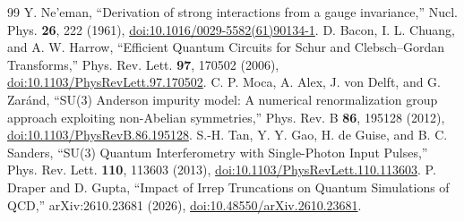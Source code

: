 \documentclass[aps,onecolumn,10pt,superscriptaddress,floatfix,nofootinbib]{revtex4}
\begin{document}
\begin{thebibliography}{99}
 Y. Ne'eman, ``Derivation of strong interactions from a gauge invariance,'' Nucl. Phys. \textbf{26}, 222 (1961), \href{https://doi.org/10.1016/0029-5582(61)90134-1}{doi:10.1016/0029-5582(61)90134-1}.
 D. Bacon, I. L. Chuang, and A. W. Harrow, ``Efficient Quantum Circuits for Schur and Clebsch--Gordan Transforms,'' Phys. Rev. Lett. \textbf{97}, 170502 (2006), \href{https://doi.org/10.1103/PhysRevLett.97.170502}{doi:10.1103/PhysRevLett.97.170502}.
 C. P. Moca, A. Alex, J. von Delft, and G. Zar\'and, ``SU(3) Anderson impurity model: A numerical renormalization group approach exploiting non-Abelian symmetries,'' Phys. Rev. B \textbf{86}, 195128 (2012), \href{https://doi.org/10.1103/PhysRevB.86.195128}{doi:10.1103/PhysRevB.86.195128}.
 S.-H. Tan, Y. Y. Gao, H. de Guise, and B. C. Sanders, ``SU(3) Quantum Interferometry with Single-Photon Input Pulses,'' Phys. Rev. Lett. \textbf{110}, 113603 (2013), \href{https://doi.org/10.1103/PhysRevLett.110.113603}{doi:10.1103/PhysRevLett.110.113603}.
 P. Draper and D. Gupta, ``Impact of Irrep Truncations on Quantum Simulations of QCD,'' arXiv:2610.23681 (2026), \href{https://doi.org/10.48550/arXiv.2610.23681}{doi:10.48550/arXiv.2610.23681}.
\end{thebibliography}
\end{document}
